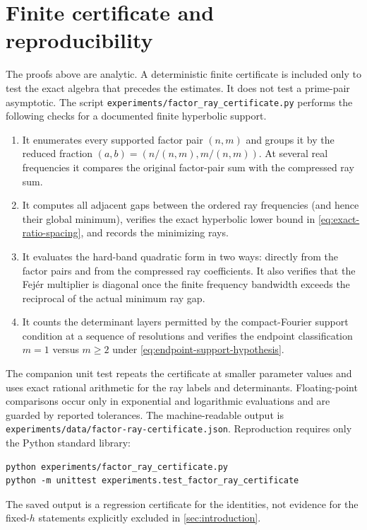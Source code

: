 \section{Finite certificate and reproducibility}
\label{sec:computation}

The proofs above are analytic.  A deterministic finite certificate is
included only to test the exact algebra that precedes the estimates.  It
does not test a prime-pair asymptotic.  The script
\texttt{experiments/factor\_ray\_certificate.py} performs the following
checks for a documented finite hyperbolic support.

\begin{enumerate}[label=\textup{(\roman*)}]
 \item It enumerates every supported factor pair $(n,m)$ and groups it by
 the reduced fraction $(a,b)=(n/(n,m),m/(n,m))$.  At several real
 frequencies it compares the original factor-pair sum with the compressed
 ray sum.

 \item It computes all adjacent gaps between the ordered ray frequencies
 (and hence their global minimum), verifies the exact hyperbolic lower
 bound in \eqref{eq:exact-ratio-spacing}, and records the minimizing rays.

 \item It evaluates the hard-band quadratic form in two ways: directly
 from the factor pairs and from the compressed ray coefficients.  It also
 verifies that the Fej\'er multiplier is diagonal once the finite frequency
 bandwidth exceeds the reciprocal of the actual minimum ray gap.

 \item It counts the determinant layers permitted by the compact-Fourier
 support condition at a sequence of resolutions and verifies the endpoint classification
 $m=1$ versus $m\geq2$ under \eqref{eq:endpoint-support-hypothesis}.
\end{enumerate}

The companion unit test repeats the certificate at smaller parameter
values and uses exact rational arithmetic for the ray labels and
determinants.  Floating-point comparisons occur only in exponential and
logarithmic evaluations and are guarded by reported tolerances.  The
machine-readable output is
\texttt{experiments/data/factor-ray-certificate.json}.  Reproduction
requires only the Python standard library:
\begin{verbatim}
python experiments/factor_ray_certificate.py
python -m unittest experiments.test_factor_ray_certificate
\end{verbatim}
The saved output is a regression certificate for the identities, not
evidence for the fixed-$h$ statements explicitly excluded in
\cref{sec:introduction}.


